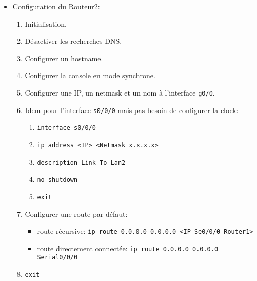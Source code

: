 \documentclass[a4paper]{article}
\begin{document}
\begin{itemize}
\begin{enumerate}
    \item Configurer une route statique vers le LAN3\footnote{Comme notre liaison est une liaison point-à-point, nous avons la possibilité de choisir entre une route récursive ou une route directement connectée.}:
    \begin{itemize}
        \item route récursive: \texttt{ip route 10.1.3.0 255.255.255.0 <IP\_Se0/0/0\_Router2>}
        \item route directement connectée: \texttt{ip route 10.1.3.0 255.255.255.0 s0/0/0}
    \end{itemize}
    
    \item \texttt{exit}

\end{enumerate}





\item Configuration du Routeur2:
\begin{enumerate}

    \item Initialisation.
    \item Désactiver les recherches DNS.
    \item Configurer un hostname.
    \item Configurer la console en mode synchrone.
    \item Configurer une IP, un netmask et un nom à l'interface \texttt{g0/0}.
    \item Idem pour l'interface \texttt{s0/0/0} mais pas besoin de configurer la clock:
    \begin{enumerate}
        \item \texttt{interface s0/0/0}
        \item \texttt{ip address <IP> <Netmask x.x.x.x>}
        \item \texttt{description Link To Lan2}
        \item \texttt{no shutdown}
        \item \texttt{exit}
    \end{enumerate}
    \item Configurer une route par défaut:
    \begin{itemize}
        \item route récursive: \texttt{ip route 0.0.0.0 0.0.0.0 <IP\_Se0/0/0\_Router1>}
        \item route directement connectée: \texttt{ip route 0.0.0.0 0.0.0.0 Serial0/0/0}
    \end{itemize}
    \item \texttt{exit}


\end{enumerate}
\end{itemize}
\end{document}
